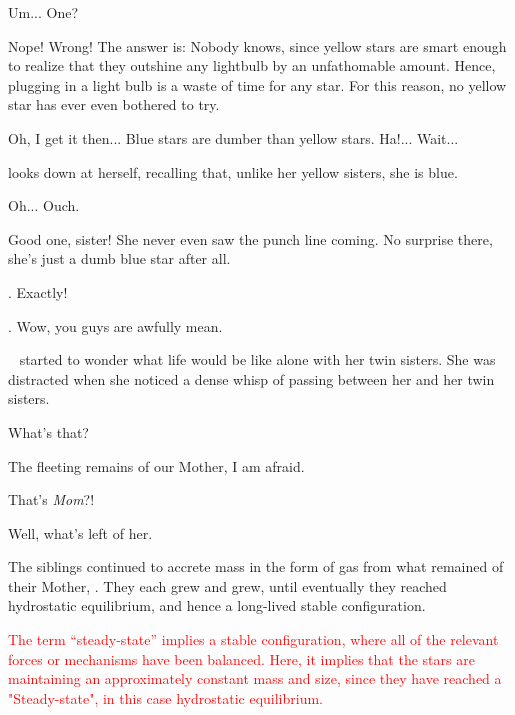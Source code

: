 \documentclass[main.tex]{subfiles}
\begin{document}
\par \Celaeno Um... One?

\par \Taygete Nope!  Wrong!  The answer is:  Nobody knows, since yellow stars are smart enough to realize that they outshine any lightbulb by an unfathomable amount.   Hence, plugging in a light bulb is a waste of time for any star. For this reason, no yellow star has ever even bothered to try.

\par \Celaeno Oh, I get it then...  Blue stars are dumber than yellow stars.  Ha!...  Wait...

\par \nar \rmcelaeno looks down at herself, recalling that, unlike her yellow sisters, she is blue.

\par \Celaeno Oh...  Ouch.

\par \Alcyone Good one, sister!  She never even saw the punch line coming.  No surprise there, she's just a dumb blue star after all.

\par \Taygete. Exactly!

\par \Celaeno. Wow, you guys are awfully mean.

\par \nar \rmcelaeno~ started to wonder what life would be like alone with her twin sisters.  She was distracted when she noticed a dense whisp of \rmpleione passing between her and her twin sisters.  

\par \Celaeno What's that?

\par \Maia The fleeting remains of our Mother, I am afraid.

\par \Electra That's \textit{Mom}?!

\par \Maia Well, what's left of her.

\par \nar The siblings continued to accrete mass in the form of gas from what remained of their Mother, \rmpleione.  They each grew and grew, until eventually they reached hydrostatic equilibrium, and hence a long-lived stable configuration.  

\begin{tcolorbox}[sharp corners, colback=red!30, colframe=red!80!blue, title=Steady-State]
\par \textcolor{red} {The term ``steady-state'' implies a stable configuration, where all of the relevant forces or mechanisms have been balanced.  Here, it implies that the stars are maintaining an approximately constant mass and size, since they have reached a "Steady-state", in this case hydrostatic equilibrium.} 
\end{tcolorbox}
\end{document}
